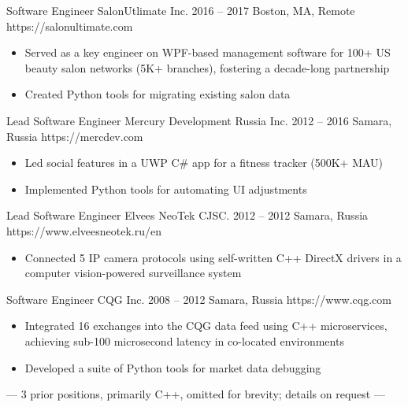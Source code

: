 \documentclass[9pt,a4paper]{juicv}
\begin{document}
\begin{paracol}{2}
    \cvLeftEvent
        {Software Engineer}
        {SalonUtlimate Inc.}
        {2016 -- 2017}
        {Boston, MA, Remote}
        {https://salonultimate.com}

        \begin{itemize}
            \item Served as a key engineer on WPF-based management software
                  for 100+ US beauty salon networks (5K+ branches),
                  fostering a decade-long partnership
            \item Created Python tools for migrating existing salon data
        \end{itemize}

    \cvLeftEvent
        {Lead Software Engineer}
        {Mercury Development Russia Inc.}
        {2012 -- 2016}
        {Samara, Russia}
        {https://mercdev.com}

        \begin{itemize}
            \item Led social features in a UWP C\# app for a fitness tracker (500K+ MAU)
            \item Implemented Python tools for automating UI adjustments
        \end{itemize}

    \cvLeftEvent
        {Lead Software Engineer}
        {Elvees NeoTek CJSC.}
        {2012 -- 2012}
        {Samara, Russia}
        {https://www.elveesneotek.ru/en}

        \begin{itemize}
            \item Connected 5 IP camera protocols using self-written C++ DirectX drivers
                  in a computer vision-powered surveillance system
        \end{itemize}

    \cvLeftEvent
        {Software Engineer}
        {CQG Inc.}
        {2008 -- 2012}
        {Samara, Russia}
        {https://www.cqg.com}

        \begin{itemize}
            \item Integrated 16 exchanges into the CQG data feed using C++ microservices,
                  achieving sub-100 microsecond latency in co-located environments
            \item Developed a suite of Python tools for market data debugging
        \end{itemize}

    \vspace{2pt}
    \centerline{%
        \footnotesize
        \color{secondaryTextColor}
        --- 3 prior positions, primarily C++, omitted for brevity; details on request ---
    }%


\end{paracol}
\end{document}
